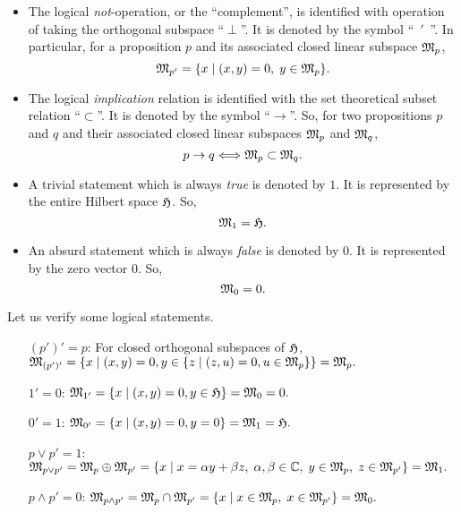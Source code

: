 \documentclass[%
  preprint,
 showpacs,
 showkeys,
 preprintnumbers,
 amsmath,amssymb,
 aps,
 rmp,
  longbibliography,
 ]{revtex4-1}
\begin{document}
\begin{itemize}
\item
The logical {\it not}-operation, or the ``complement'',
is
identified with operation of taking the orthogonal subspace ``$\perp$''.
It is denoted by the symbol ``~$'$~''.
In particular, for a
proposition $p$ and its associated closed linear
subspace
${\frak M}_p$,
$$
{\frak M}_{p'} =
 \{x \mid (x,y)=0,\; y\in
{\frak M}_p
\} .$$

\item
The logical {\it implication} relation is identified with the set
theoretical subset relation ``$\subset$''.
It is denoted by the symbol ``$\rightarrow$''.
So, for two
propositions $p$ and $q$ and their associated closed linear
subspaces
${\frak M}_p$ and
${\frak M}_q$,
$$
{p\rightarrow q} \Longleftrightarrow
{\frak M}_{p} \subset
{\frak M}_{q}.$$

\item
A trivial statement which is always {\it true} is denoted by $1$.
It is represented by the entire Hilbert space $\frak H$.
So, $${\frak M}_1=\frak H.$$

\item
An absurd statement which is always {\it false} is denoted by $0$.
It is represented by the zero vector $0$.
So, $${\frak M}_0= 0.$$
\end{itemize}
Let us verify some logical statements.
\begin{itemize}
\item[$(p')'=p$:]
For closed orthogonal subspaces of ${\frak H}$,
$
{\frak M}_{(p')'}
=
\{x\mid (x,y)=0, y\in
\{z\mid (z,u)=0, u\in
{\frak M}_{p} \} \} =
{\frak M}_{p}.
$
\item[$1'=0$:]
$
{\frak M}_{1'}
=
\{x\mid (x,y)=0, y\in {\frak H}\} ={\frak M}_0= 0.
$
\item[$0'=1$:]
$
{\frak M}_{0'}
=
\{x\mid (x,y)=0, y=0\} ={\frak M}_1= {\frak H}.
$

\item[$p\vee p'=1$:]
$
{\frak M}_{p\vee p'}=
{\frak M}_{p} \oplus
{\frak M}_{p'}
=
 \{x \mid x=\alpha y+\beta z,\; \alpha,\beta \in {\Bbb C},\; y\in
{\frak M}_p, \;
z\in {\frak M}_{p'}\} ={\frak M}_1 .$

\item[$p\wedge p'=0$:]
$
{\frak M}_{p\wedge p'}=
{\frak M}_{p} \cap
{\frak M}_{p'}
=
 \{x \mid x\in
{\frak M}_p, \;
x\in {\frak M}_{p'}\} ={\frak M}_0 .$

\end{itemize}
\end{document}
